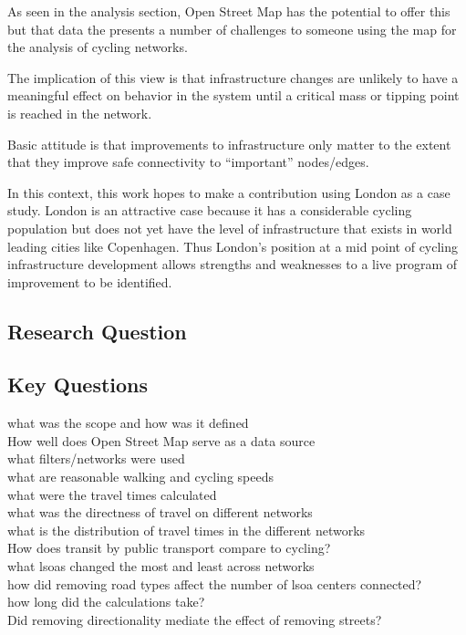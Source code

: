 As seen in the analysis section, Open Street Map has the potential to offer this but that data the presents a number of challenges to someone using the map for the analysis of cycling networks. 

 The implication of this view is that infrastructure changes are unlikely to have a meaningful effect on behavior in the system until a critical mass or tipping point is reached in the network. 

Basic attitude is that improvements to infrastructure only matter to the extent that they improve safe connectivity to ``important'' nodes/edges. 

In this context, this work hopes to make a contribution using London as a case study. London is an attractive case because it has a considerable cycling population but does not yet have the level of infrastructure that exists in world leading cities like Copenhagen. Thus London's position at a mid point of cycling infrastructure development allows strengths and weaknesses to a live program of improvement to be identified. 


\subsection{Research Question}

\subsection{Key Questions}
what was the scope and how was it defined \\
How well does Open Street Map serve as a data source \\
what filters/networks were used \\
what are reasonable walking and cycling speeds \\
what were the travel times calculated \\
what was the directness of travel on different networks \\
what is the distribution of travel times in the different networks \\
How does transit by public transport compare to cycling? \\
what lsoas changed the most and least across networks \\
how did removing road types affect the number of lsoa centers connected? \\
how long did the calculations take? \\
Did removing directionality mediate the effect of removing streets? \\


